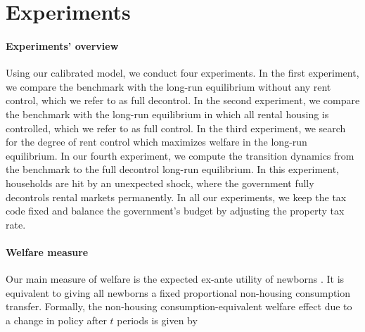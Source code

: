 \documentclass[parskip=full]{article}
\begin{document}

\section{Experiments}\label{section:experiments}

\paragraph{Experiments' overview} Using our calibrated model, we conduct four experiments. In the first experiment, we compare the benchmark with the long-run equilibrium without any rent control, which we refer to as full decontrol. In the second experiment, we compare the benchmark with the long-run equilibrium in which all rental housing is controlled, which we refer to as full control. In the third experiment, we search for the degree of rent control which maximizes welfare in the long-run equilibrium. In our fourth experiment, we compute the transition dynamics from the benchmark to the full decontrol long-run equilibrium. In this experiment, households are hit by an unexpected shock, where the government fully decontrols rental markets permanently. In all our experiments, we keep the tax code fixed and balance the government's budget by adjusting the property tax rate. 

\paragraph{Welfare measure} Our main measure of welfare is the expected ex-ante utility of newborns \citep{ralws-1971,conesa-et-al,gkkoc}. It is equivalent to giving all newborns a fixed proportional non-housing consumption transfer. Formally, the non-housing consumption-equivalent welfare effect due to a change in policy after $t$ periods is given by
\end{document}
